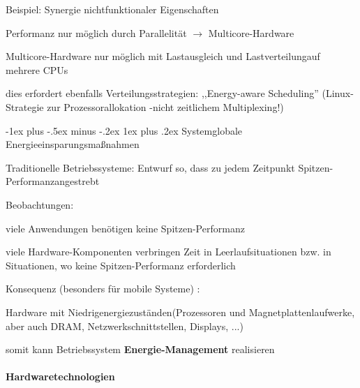 \documentclass[a4paper]{article}
\makeatletter
\renewcommand{\subsubsection}{\@startsection{subsubsection}{3}{0mm}%
 {-1ex plus -.5ex minus -.2ex}%
 {1ex plus .2ex}%
 {\normalfont\small\bfseries}}
\makeatother
\begin{document}
\begin{multicols}{3}
\begin{itemize*}
        \item
        Beispiel: Synergie nichtfunktionaler Eigenschaften
        \begin{itemize*}
            \item Performanz nur möglich durch Parallelität $\rightarrow$ Multicore-Hardware
            \item Multicore-Hardware nur möglich mit Lastausgleich und Lastverteilungauf mehrere CPUs
            \item dies erfordert ebenfalls Verteilungsstrategien: ,,Energy-aware Scheduling'' (Linux-Strategie zur Prozessorallokation -nicht zeitlichem Multiplexing!)
        \end{itemize*}
    \end{itemize*}


    \subsubsection{Systemglobale
        Energieeinsparungsmaßnahmen}

    \begin{itemize*}
        \item
        Traditionelle Betriebssysteme: Entwurf so, dass zu jedem Zeitpunkt
        Spitzen-Performanzangestrebt
        \item
        Beobachtungen:
        \begin{itemize*}
            \item viele Anwendungen benötigen keine Spitzen-Performanz
            \item viele Hardware-Komponenten verbringen Zeit in Leerlaufsituationen bzw. in Situationen, wo keine Spitzen-Performanz erforderlich
        \end{itemize*}
        \item
        Konsequenz (besonders für mobile Systeme) :
        \begin{itemize*}
            \item Hardware mit Niedrigenergiezuständen(Prozessoren und Magnetplattenlaufwerke, aber auch DRAM, Netzwerkschnittstellen, Displays, ...)
            \item somit kann Betriebssystem \textbf{Energie-Management} realisieren
        \end{itemize*}
    \end{itemize*}


    \paragraph{Hardwaretechnologien}


\end{multicols}
\end{document}
